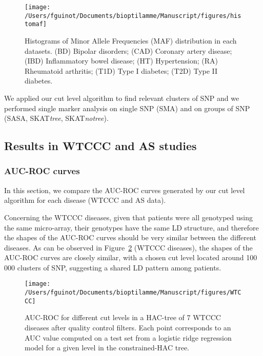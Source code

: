 \documentclass[]{book}
\begin{document}
\begin{figure}

{\centering \texttt{[image: /Users/fguinot/Documents/bioptilamme/Manuscript/figures/histomaf]} 

}

\caption{Histograms of Minor Allele Frequencies (MAF) distribution in each datasets. (BD) Bipolar disorders; (CAD) Coronary artery disease; (IBD) Inflammatory bowel disease; (HT) Hypertension; (RA) Rheumatoid arthritis; (T1D) Type I diabetes; (T2D) Type II diabetes.}\label{fig:histomaf}
\end{figure}

We applied our cut level algorithm to find relevant clusters of SNP and
we performed single marker analysis on single SNP (SMA) and on groups of
SNP (SASA, SKAT\emph{tree}, SKAT\emph{notree}).

\hypertarget{realdata}{%
\subsection{Results in WTCCC and AS studies}\label{realdata}}

\hypertarget{auc-roc-curves}{%
\subsubsection{AUC-ROC curves}\label{auc-roc-curves}}

In this section, we compare the AUC-ROC curves generated by our cut
level algorithm for each disease (WTCCC and AS data).

Concerning the WTCCC diseases, given that patients were all genotyped
using the same micro-array, their genotypes have the same LD structure,
and therefore the shapes of the AUC-ROC curves should be very similar
between the different diseases. As can be observed in
Figure~\ref{fig:WTCCC} (WTCCC diseases), the shapes of the AUC-ROC curves
are closely similar, with a chosen cut level located around 100 000
clusters of SNP, suggesting a shared LD pattern among patients.



\begin{figure}

{\centering \texttt{[image: /Users/fguinot/Documents/bioptilamme/Manuscript/figures/WTCCC]} 

}

\caption{AUC-ROC for different cut levels in a HAC-tree of 7 WTCCC diseases after quality control filters. Each point corresponds to an AUC value computed on a test set from a logistic ridge regression model for a given level in the constrained-HAC tree.}\label{fig:WTCCC}
\end{figure}
\end{document}
